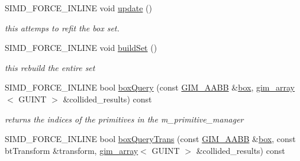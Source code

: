 \begin{DoxyCompactItemize}
\item 
S\+I\+M\+D\+\_\+\+F\+O\+R\+C\+E\+\_\+\+I\+N\+L\+I\+N\+E void \hyperlink{class_g_i_m___b_o_x___t_r_e_e___t_e_m_p_l_a_t_e___s_e_t_a0f5f2b683e561a4e05d912cb4973dac4}{update} ()
\begin{DoxyCompactList}\small\item\em this attemps to refit the box set. \end{DoxyCompactList}\item 
\hypertarget{class_g_i_m___b_o_x___t_r_e_e___t_e_m_p_l_a_t_e___s_e_t_aada2fc55c2e11a4aa5c3ae0c852f4950}{S\+I\+M\+D\+\_\+\+F\+O\+R\+C\+E\+\_\+\+I\+N\+L\+I\+N\+E void \hyperlink{class_g_i_m___b_o_x___t_r_e_e___t_e_m_p_l_a_t_e___s_e_t_aada2fc55c2e11a4aa5c3ae0c852f4950}{build\+Set} ()}\label{class_g_i_m___b_o_x___t_r_e_e___t_e_m_p_l_a_t_e___s_e_t_aada2fc55c2e11a4aa5c3ae0c852f4950}

\begin{DoxyCompactList}\small\item\em this rebuild the entire set \end{DoxyCompactList}\item 
\hypertarget{class_g_i_m___b_o_x___t_r_e_e___t_e_m_p_l_a_t_e___s_e_t_a5863549e9a3390f9ef1c0883734481ee}{S\+I\+M\+D\+\_\+\+F\+O\+R\+C\+E\+\_\+\+I\+N\+L\+I\+N\+E bool \hyperlink{class_g_i_m___b_o_x___t_r_e_e___t_e_m_p_l_a_t_e___s_e_t_a5863549e9a3390f9ef1c0883734481ee}{box\+Query} (const \hyperlink{class_g_i_m___a_a_b_b}{G\+I\+M\+\_\+\+A\+A\+B\+B} \&\hyperlink{structbox}{box}, \hyperlink{classgim__array}{gim\+\_\+array}$<$ G\+U\+I\+N\+T $>$ \&collided\+\_\+results) const }\label{class_g_i_m___b_o_x___t_r_e_e___t_e_m_p_l_a_t_e___s_e_t_a5863549e9a3390f9ef1c0883734481ee}

\begin{DoxyCompactList}\small\item\em returns the indices of the primitives in the m\+\_\+primitive\+\_\+manager \end{DoxyCompactList}\item 
\hypertarget{class_g_i_m___b_o_x___t_r_e_e___t_e_m_p_l_a_t_e___s_e_t_a21ac3e2b0030e1cfc1a6ddb8376eff2d}{S\+I\+M\+D\+\_\+\+F\+O\+R\+C\+E\+\_\+\+I\+N\+L\+I\+N\+E bool \hyperlink{class_g_i_m___b_o_x___t_r_e_e___t_e_m_p_l_a_t_e___s_e_t_a21ac3e2b0030e1cfc1a6ddb8376eff2d}{box\+Query\+Trans} (const \hyperlink{class_g_i_m___a_a_b_b}{G\+I\+M\+\_\+\+A\+A\+B\+B} \&\hyperlink{structbox}{box}, const bt\+Transform \&transform, \hyperlink{classgim__array}{gim\+\_\+array}$<$ G\+U\+I\+N\+T $>$ \&collided\+\_\+results) const }\label{class_g_i_m___b_o_x___t_r_e_e___t_e_m_p_l_a_t_e___s_e_t_a21ac3e2b0030e1cfc1a6ddb8376eff2d}


\end{DoxyCompactItemize}
